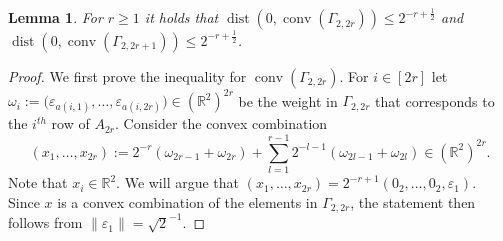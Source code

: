 \documentclass[10pt,a4paper]{article}
\newtheorem{lem}[thm]{Lemma}\crefname{lem}{Lemma}{Lemmas}
\numberwithin{equation}{section}
\DeclareMathOperator{\conv}{conv}
\DeclareMathOperator{\dist}{dist}
\newcommand{\RR}{\mathbb R}
\newcommand{\eps}{\varepsilon}
\begin{document}
\begin{lem}\label{lem:convCombQubits}
For $r \geq 1$ it holds that $\dist(0, \conv(\Gamma_{2,2r}) ) \leq 2^{-r+ \frac{1}{2}}$ and $\dist(0, \conv(\Gamma_{2,2r+1}) ) \leq 2^{-r+ \frac{1}{2}}$.
\end{lem}

\begin{proof}
We first prove the inequality for $\conv(\Gamma_{2,2r})$. For $i \in [2r]$ let $\omega_i := \big( \eps_{a(i,1)}, \ldots, \eps_{a(i,2r)} \big) \in \left( \RR^2 \right)^{2r}$ be the weight in $\Gamma_{2,2r}$ that corresponds to the $i^{th}$ row of $A_{2r}$. Consider the convex combination
	\begin{equation}\label{eq:convCombGamma}
	(x_1, \ldots, x_{2r}) := 2^{-r} ( \omega_{2r-1} + \omega_{2r} ) + \sum_{l=1}^{r-1} 2^{-l-1} ( \omega_{2l-1} + \omega_{2l}) \in \left( \RR^2 \right)^{2r}.
	\end{equation}
Note that $x_i \in \RR^2$. We will argue that $(x_1, \dots, x_{2r}) = 2^{-r+1} (0_2,\ldots,0_2, \eps_{1})$.
Since $x$ is a convex combination of the elements in $\Gamma_{2,2r}$, the statement then follows from $\| \eps_1 \| = \sqrt{2}^{-1}$.


\end{proof}
\end{document}
